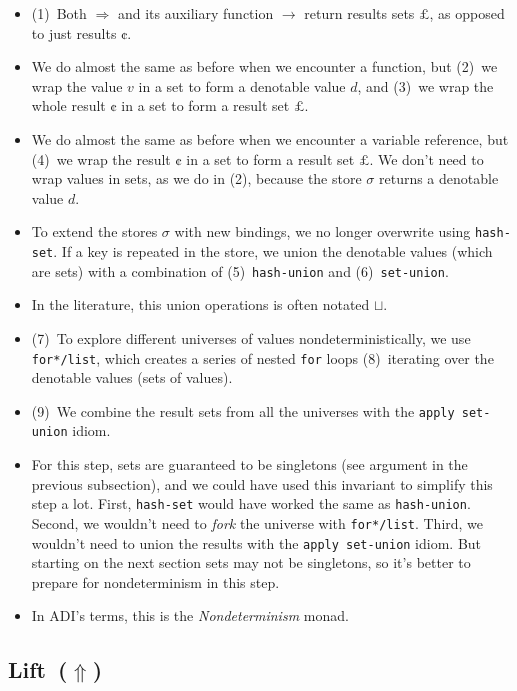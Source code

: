 \documentclass[12pt, oneside]{book}
\begin{document}
\begin{itemize}
  \item (1)~Both \(⇒\) and its auxiliary function \(→\) return results sets \(£\), as opposed to just results \(¢\).
  \item We do almost the same as before when we encounter a function, but (2)~we wrap the value \(v\) in a set to form a denotable value \(d\), and (3)~we wrap the whole result \(¢\) in a set to form a result set \(£\).
  \item We do almost the same as before when we encounter a variable reference, but (4)~we wrap the result \(¢\) in a set to form a result set \(£\). We don’t need to wrap values in sets, as we do in (2), because the store \(σ\) returns a denotable value \(d\).
  \item To extend the stores \(σ\) with new bindings, we no longer overwrite using \texttt{hash-set}. If a key is repeated in the store, we union the denotable values (which are sets) with a combination of (5)~\texttt{hash-union} and (6)~\texttt{set-union}.
  \item In the literature, this union operations is often notated \(⊔\).
  \item (7)~To explore different universes of values nondeterministically, we use \texttt{for*/list}, which creates a series of nested \texttt{for} loops (8)~iterating over the denotable values (sets of values).
  \item (9)~We combine the result sets from all the universes with the \texttt{apply set-union} idiom.
  \item For this step, sets are guaranteed to be singletons (see argument in the previous subsection), and we could have used this invariant to simplify this step a lot. First, \texttt{hash-set} would have worked the same as \texttt{hash-union}. Second, we wouldn’t need to \emph{fork} the universe with \texttt{for*/list}. Third, we wouldn’t need to union the results with the \texttt{apply set-union} idiom. But starting on the next section sets may not be singletons, so it’s better to prepare for nondeterminism in this step.
  \item In ADI’s terms, this is the \emph{Nondeterminism} monad.
\end{itemize}

\subsection{Lift~(\(⇑\))}
\end{document}

